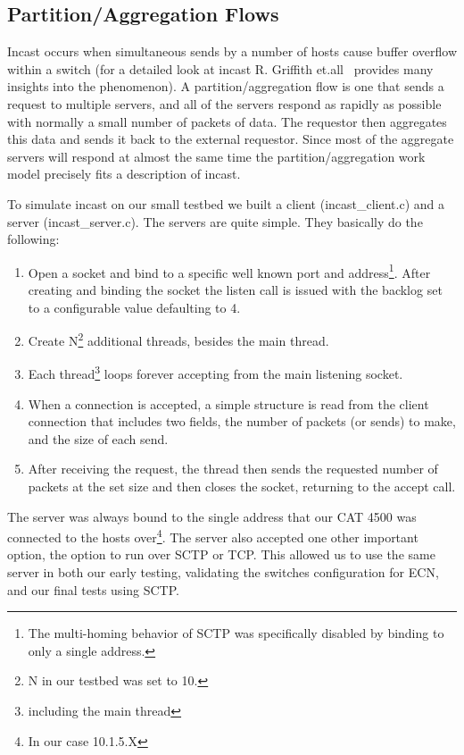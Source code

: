 \documentclass[12pt]{article}
\begin{document}
\subsection{Partition/Aggregation Flows}
\label{partition}

Incast occurs when simultaneous sends by a number of hosts cause buffer overflow within
a switch (for a detailed look at incast R. Griffith et.all~\cite{griffen}  provides many insights into the phenomenon). A
partition/aggregation flow is one that sends a request to multiple servers, and all of the servers respond
as rapidly as possible with normally a small number of packets of data. The requestor then aggregates
this data and sends it back to the external requestor. Since most of the aggregate servers will respond
at almost the same time the partition/aggregation work model precisely fits a description of incast. 

To simulate incast on our small testbed we built a client (incast\_client.c) and a server (incast\_server.c).
The servers are quite simple. They basically do the following:
\begin{enumerate}

\item Open a socket and bind to a specific well known port and address\footnote{The multi-homing
behavior of SCTP was specifically disabled by binding to only a single address.}. After creating and
binding the socket the listen call is issued with the backlog set to a configurable value defaulting to 4.

\item Create N\footnote{N in our testbed was set to 10.} additional threads, besides the main thread.

\item Each thread\footnote{including the main thread} loops forever accepting from the main listening socket.

\item When a connection is accepted, a simple structure is read from the client connection that includes two fields, the
number of packets (or sends) to make, and the size of each send.

\item After receiving the request, the thread then sends the requested number of packets at the set
size and then closes the socket, returning to the accept call.

\end{enumerate}

The server
was always bound to the single address that our CAT 4500 was connected to the hosts over\footnote{In our case 10.1.5.X}.
The server also accepted one other important option, the option to run over SCTP or TCP. This allowed us to use
the same server in both our early testing, validating the switches configuration for ECN, and our final tests
using SCTP.
\end{document}
